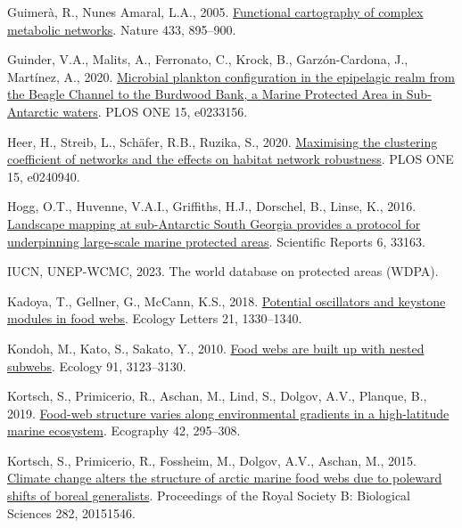 \documentclass[preprint, 3p,
authoryear]{elsarticle} %
\newlength{\cslhangindent}
\newlength{\cslentryspacingunit} %
\newenvironment{CSLReferences}[2] %
 {%
  \setlength{\parindent}{0pt}
  \ifodd #1
  \let\oldpar\par
  \def\par{\hangindent=\cslhangindent\oldpar}
  \fi
  \setlength{\parskip}{#2\cslentryspacingunit}
 }%
 {}
\begin{document}
\begin{CSLReferences}{1}{0}
\leavevmode{}%
Guimerà, R., Nunes Amaral, L.A., 2005.
\href{https://doi.org/10.1038/nature03288}{Functional cartography of
complex metabolic networks}. Nature 433, 895--900.

\leavevmode{}%
Guinder, V.A., Malits, A., Ferronato, C., Krock, B., Garzón-Cardona, J.,
Martínez, A., 2020.
\href{https://doi.org/10.1371/journal.pone.0233156}{Microbial plankton
configuration in the epipelagic realm from the {Beagle Channel} to the
{Burdwood Bank}, a {Marine Protected Area} in {Sub-Antarctic} waters}.
PLOS ONE 15, e0233156.

\leavevmode{}%
Heer, H., Streib, L., Schäfer, R.B., Ruzika, S., 2020.
\href{https://doi.org/10.1371/journal.pone.0240940}{Maximising the
clustering coefficient of networks and the effects on habitat network
robustness}. PLOS ONE 15, e0240940.

\leavevmode{}%
Hogg, O.T., Huvenne, V.A.I., Griffiths, H.J., Dorschel, B., Linse, K.,
2016. \href{https://doi.org/10.1038/srep33163}{Landscape mapping at
sub-{Antarctic South Georgia} provides a protocol for underpinning
large-scale marine protected areas}. Scientific Reports 6, 33163.

\leavevmode{}%
IUCN, UNEP-WCMC, 2023. The world database on protected areas ({WDPA}).

\leavevmode{}%
Kadoya, T., Gellner, G., McCann, K.S., 2018.
\href{https://doi.org/10.1111/ele.13099}{Potential oscillators and
keystone modules in food webs}. Ecology Letters 21, 1330--1340.

\leavevmode{}%
Kondoh, M., Kato, S., Sakato, Y., 2010.
\href{https://doi.org/10.1890/09-2219.1}{Food webs are built up with
nested subwebs}. Ecology 91, 3123--3130.

\leavevmode{}%
Kortsch, S., Primicerio, R., Aschan, M., Lind, S., Dolgov, A.V.,
Planque, B., 2019. \href{https://doi.org/10.1111/ecog.03443}{Food-web
structure varies along environmental gradients in a high-latitude marine
ecosystem}. Ecography 42, 295--308.

\leavevmode{}%
Kortsch, S., Primicerio, R., Fossheim, M., Dolgov, A.V., Aschan, M.,
2015. \href{https://doi.org/10.1098/rspb.2015.1546}{Climate change
alters the structure of arctic marine food webs due to poleward shifts
of boreal generalists}. Proceedings of the Royal Society B: Biological
Sciences 282, 20151546.


\end{CSLReferences}
\end{document}
